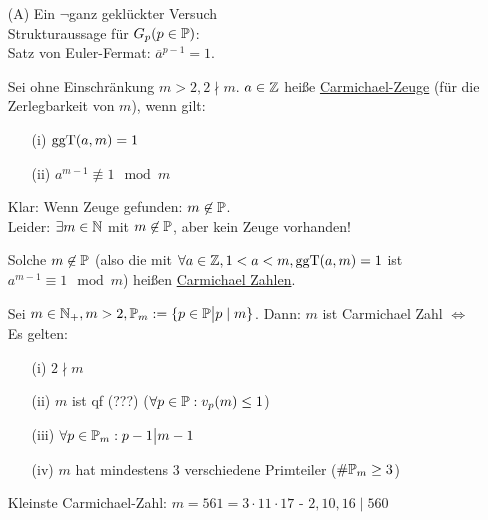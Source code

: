 \documentclass[a4paper,twoside,DIV15,BCOR12mm]{scrbook}
\begin{document}
\begin{itemize}
 \item[(A)] Ein $\neg$ganz geklückter Versuch\\
  Strukturaussage für $G_p (p \in \mathbb{P})$:\\
  Satz von Euler-Fermat: $\overline a^{p-1} = 1$.
  \begin{definition}
   Sei ohne Einschränkung $m > 2, 2 \nmid m$. $a \in \mathbb{Z}$ heiße \underline{Carmichael-Zeuge} (für die Zerlegbarkeit von $m$), wenn gilt:
    \begin{itemize}
     \item[(i)] $\mathop{\rm ggT}\nolimits (a,m) = 1$
     \item[(ii)] $a^{m-1} \not\equiv 1 \mod m$
    \end{itemize}
  \end{definition}
  Klar: Wenn Zeuge gefunden: $m \not\in \mathbb{P}$.\\
  Leider: $\exists m \in \mathbb{N}$ mit $m \not\in \mathbb{P}$, aber kein Zeuge vorhanden!
  \begin{definition}
   Solche $m \not\in \mathbb{P}$ (also die mit $\forall a \in \mathbb{Z}, 1 < a < m, \mathop{\rm ggT}\nolimits (a,m) = 1$ ist $a^{m-1} \equiv 1 \mod m$) heißen \underline{Carmichael Zahlen}.
  \end{definition}
  \begin{satz}
   Sei $m \in \mathbb{N}_+, m > 2, \mathbb{P}_m := \{p \in \mathbb{P} \big| p \mid m\}$. Dann: $m$ ist Carmichael Zahl $\Leftrightarrow$ Es gelten:
    \begin{itemize}
     \item[(i)] $2 \nmid m$
     \item[(ii)] $m$ ist qf (???) ($\forall p \in \mathbb{P}: v_p(m) \le 1$)
     \item[(iii)] $\forall p \in \mathbb{P}_m: p-1 \big| m-1$
     \item[(iv)] $m$ hat mindestens 3 verschiedene Primteiler ($\#\mathbb{P}_m \ge 3$)
    \end{itemize}
  \end{satz}
  \begin{beispiel}
   Kleinste Carmichael-Zahl: $m = 561 = 3 \cdot 11 \cdot 17$ - $2,10,16 \mid 560$
  \end{beispiel}
  \begin{beweis}
\end{beweis}
\end{itemize}
\end{document}
